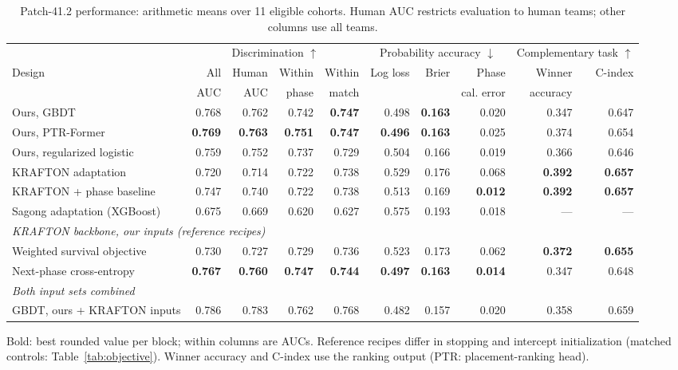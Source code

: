 \begin{table}[t]
\centering\footnotesize
\caption{Patch-41.2 performance: arithmetic means over 11 eligible cohorts. Human AUC restricts evaluation to human teams; other columns use all teams.}
\label{tab:main}
\setlength{\tabcolsep}{2.5pt}
\begin{tabular*}{\textwidth}{@{\extracolsep{\fill}}lrrrrrrrrr@{}}
\toprule
 & \multicolumn{4}{c}{Discrimination $\uparrow$} & \multicolumn{3}{c}{Probability accuracy $\downarrow$} & \multicolumn{2}{c}{Complementary task $\uparrow$} \\
\cmidrule(lr){2-5}\cmidrule(lr){6-8}\cmidrule(lr){9-10}
Design & All & Human & Within & Within & Log loss & Brier & Phase & Winner & C-index \\
 & AUC & AUC & phase & match & & & cal. error & accuracy & \\
\midrule
Ours, GBDT & 0.768 & 0.762 & 0.742 & \textbf{0.747} & 0.498 & \textbf{0.163} & 0.020 & 0.347 & 0.647 \\
Ours, PTR-Former & \textbf{0.769} & \textbf{0.763} & \textbf{0.751} & \textbf{0.747} & \textbf{0.496} & \textbf{0.163} & 0.025 & 0.374 & 0.654 \\
Ours, regularized logistic & 0.759 & 0.752 & 0.737 & 0.729 & 0.504 & 0.166 & 0.019 & 0.366 & 0.646 \\
KRAFTON adaptation & 0.720 & 0.714 & 0.722 & 0.738 & 0.529 & 0.176 & 0.068 & \textbf{0.392} & \textbf{0.657} \\
KRAFTON + phase baseline & 0.747 & 0.740 & 0.722 & 0.738 & 0.513 & 0.169 & \textbf{0.012} & \textbf{0.392} & \textbf{0.657} \\
Sagong adaptation (XGBoost) & 0.675 & 0.669 & 0.620 & 0.627 & 0.575 & 0.193 & 0.018 & --- & --- \\
\midrule
\multicolumn{10}{l}{\emph{KRAFTON backbone, our inputs (reference recipes)}} \\
Weighted survival objective & 0.730 & 0.727 & 0.729 & 0.736 & 0.523 & 0.173 & 0.062 & \textbf{0.372} & \textbf{0.655} \\
Next-phase cross-entropy & \textbf{0.767} & \textbf{0.760} & \textbf{0.747} & \textbf{0.744} & \textbf{0.497} & \textbf{0.163} & \textbf{0.014} & 0.347 & 0.648 \\
\midrule
\multicolumn{10}{l}{\emph{Both input sets combined}} \\
GBDT, ours + KRAFTON inputs & 0.786 & 0.783 & 0.762 & 0.768 & 0.482 & 0.157 & 0.020 & 0.358 & 0.659 \\
\bottomrule
\end{tabular*}
\smallskip
\parbox{\textwidth}{\scriptsize Bold: best rounded value per block; within columns are AUCs. Reference recipes differ in stopping and intercept initialization (matched controls: Table~\ref{tab:objective}). Winner accuracy and C-index use the ranking output (PTR: placement-ranking head).}
\end{table}

